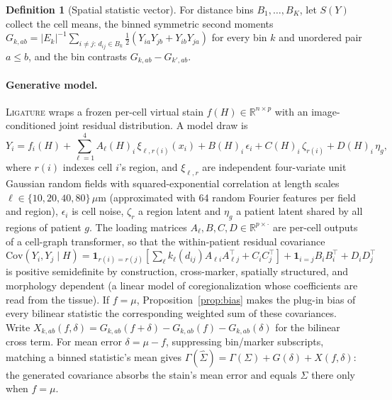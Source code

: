 \documentclass[10pt,letterpaper]{article}
\theoremstyle{definition}
\newtheorem{definition}{Definition}
\theoremstyle{remark}
\newcommand{\Cov}{\mathrm{Cov}}
\newcommand{\method}{\textnormal{\textsc{Ligature}}}
\begin{document}
\begin{definition}[Spatial statistic vector]
For distance bins $B_1,\dots,B_K$, let $S(Y)$ collect the cell means, the binned symmetric second moments $G_{k,ab}=|E_k|^{-1}\sum_{i\ne j:\,d_{ij}\in B_k}\frac12(Y_{ia}Y_{jb}+Y_{ib}Y_{ja})$ for every bin $k$ and unordered pair $a\le b$, and the bin contrasts $G_{k,ab}-G_{k',ab}$.
\end{definition}

\paragraph{Generative model.} \method{} wraps a frozen per-cell virtual stain $f(H)\in\mathbb{R}^{n\times p}$ with an image-conditioned joint residual distribution. A model draw is
\begin{equation}\label{eq:model}
Y_i = f_i(H) + \sum_{\ell=1}^{4} A_{\ell}(H)_i\,\xi_{\ell,r(i)}(x_i) + B(H)_i\,\epsilon_i + C(H)_i\,\zeta_{r(i)} + D(H)_i\,\eta_g ,
\end{equation}
where $r(i)$ indexes cell $i$'s region, and $\xi_{\ell,r}$ are independent four-variate unit Gaussian random fields with squared-exponential correlation at length scales $\ell\in\{10,20,40,80\}\,\mu$m (approximated with 64 random Fourier features per field and region), $\epsilon_i$ is cell noise, $\zeta_r$ a region latent and $\eta_g$ a patient latent shared by all regions of patient $g$. The loading matrices $A_\ell,B,C,D\in\mathbb{R}^{p\times\cdot}$ are per-cell outputs of a cell-graph transformer, so that the within-patient residual covariance
$\Cov(Y_i,Y_j\mid H)=\mathbf{1}_{r(i)=r(j)}[\sum_\ell k_\ell(d_{ij})A_{\ell i}A_{\ell j}^\top+C_iC_j^\top]+\mathbf{1}_{i=j}B_iB_i^\top+D_iD_j^\top$
is positive semidefinite by construction, cross-marker, spatially structured, and morphology dependent (a linear model of coregionalization whose coefficients are read from the tissue). If $f=\mu$, Proposition~\ref{prop:bias} makes the plug-in bias of every bilinear statistic the corresponding weighted sum of these covariances. Write $X_{k,ab}(f,\delta)=G_{k,ab}(f+\delta)-G_{k,ab}(f)-G_{k,ab}(\delta)$ for the bilinear cross term. For mean error $\delta=\mu-f$, suppressing bin/marker subscripts, matching a binned statistic's mean gives $\Gamma(\hat\Sigma)=\Gamma(\Sigma)+G(\delta)+X(f,\delta)$: the generated covariance absorbs the stain's mean error and equals $\Sigma$ there only when $f=\mu$.
\end{document}
